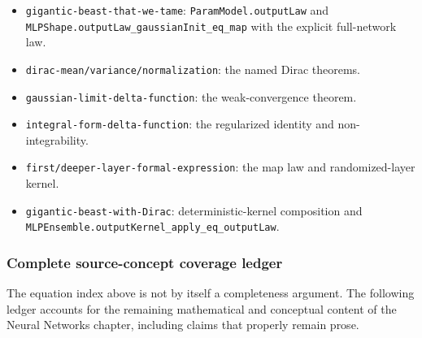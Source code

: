 \begin{itemize}
  \item \texttt{gigantic-beast-that-we-tame}: \texttt{ParamModel.outputLaw} and
    \texttt{MLPShape.outputLaw\_gaussianInit\_eq\_map} with the explicit full-network law.
  \item \texttt{dirac-mean/variance/normalization}: the named Dirac theorems.
  \item \texttt{gaussian-limit-delta-function}: the weak-convergence theorem.
  \item \texttt{integral-form-delta-function}: the regularized identity and non-integrability.
  \item \texttt{first/deeper-layer-formal-expression}: the map law and randomized-layer kernel.
  \item \texttt{gigantic-beast-with-Dirac}: deterministic-kernel composition and
    \texttt{MLPEnsemble.outputKernel\_apply\_eq\_outputLaw}.
\end{itemize}

\subsubsection*{Complete source-concept coverage ledger}

The equation index above is not by itself a completeness argument.  The following ledger accounts
for the remaining mathematical and conceptual content of the Neural Networks chapter, including
claims that properly remain prose.

